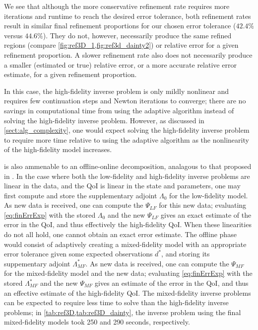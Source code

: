 We see that although the more conservative refinement rate requires more iterations and runtime to reach the desired error tolerance, both refinement rates result in similar final refinement proportions for our chosen error tolerance ($42.4\%$ versus $44.6\%$). They do not, however, necessarily produce the same refined regions (compare \cref{fig:ref3D_1,fig:ref3d_dainty2}) or relative error for a given refinement proportion. A slower refinement rate also does not necessarily produce a smaller (estimated or true) relative error, or a more accurate relative error estimate, for a given refinement proportion.

In this case, the high-fidelity inverse problem is only mildly nonlinear and requires few continuation steps and Newton iterations to converge; there are no savings in computational time from using the adaptive algorithm instead of solving the high-fidelity inverse problem. However, as discussed in \cref{sect:alg_complexity}, one would expect solving the high-fidelity inverse problem to require more time relative to using the adaptive algorithm as the nonlinearity of the high-fidelity model increases. 

 is also ammenable to an offline-online decomposition, analagous to that proposed in \cite{LiebWill13}. In the case where both the low-fidelity and high-fidelity inverse problems are linear in the data, and the QoI is linear in the state and parameters, one may first compute and store the supplementary adjoint $\Lambda_0$ for the low-fidelity model. As new data is received, one can compute the $\Psi_{LF}$ for this new data; evaluating \cref{eq:finErrExp} with the stored $\Lambda_0$ and the new $\Psi_{LF}$ gives an exact estimate of the error in the QoI, and thus effectively the high-fidelity QoI. When these linearities do not all hold, one cannot obtain an exact error estimate. The offline phase would consist of adaptively creating a mixed-fidelity model with an appropriate error tolerance given some expected observations $d^*$, and storing its suppementary adjoint $\Lambda_{MF}^*$. As new data is received, one can compute the $\Psi_{MF}$ for the mixed-fidelity model and the new data; evaluating \cref{eq:finErrExp} with the stored $\Lambda_{MF}^*$ and the new $\Psi_{MF}$ gives an estimate of the error in the QoI, and thus an effective estimate of the high-fidelity QoI. The mixed-fidelity inverse problems can be expected to require less time to solve than the high-fidelity inverse problems; in \cref{tab:ref3D,tab:ref3D_dainty}, the inverse problem using the final mixed-fidelity models took 250 and 290 seconds, respectively.


